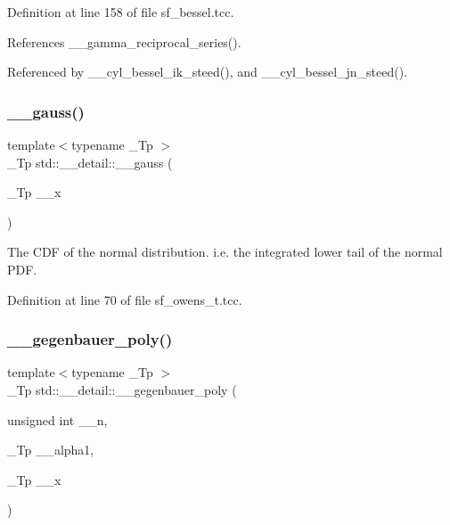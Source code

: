 Definition at line 158 of file sf\+\_\+bessel.\+tcc.



References \+\_\+\+\_\+gamma\+\_\+reciprocal\+\_\+series().



Referenced by \+\_\+\+\_\+cyl\+\_\+bessel\+\_\+ik\+\_\+steed(), and \+\_\+\+\_\+cyl\+\_\+bessel\+\_\+jn\+\_\+steed().

\mbox{\label{namespacestd_1_1____detail_afdb25beb2328b74d64d9be03de64c442}} 
\subsubsection{\texorpdfstring{\+\_\+\+\_\+gauss()}{\_\_gauss()}}
{\footnotesize\ttfamily template$<$typename \+\_\+\+Tp $>$ \\
\+\_\+\+Tp std\+::\+\_\+\+\_\+detail\+::\+\_\+\+\_\+gauss (\begin{DoxyParamCaption}\item[{\+\_\+\+Tp}]{\+\_\+\+\_\+x }\end{DoxyParamCaption})}

The C\+DF of the normal distribution. i.\+e. the integrated lower tail of the normal P\+DF. 

Definition at line 70 of file sf\+\_\+owens\+\_\+t.\+tcc.

\mbox{\label{namespacestd_1_1____detail_af8641aafc4c639c68963e53d1f6c7083}} 
\subsubsection{\texorpdfstring{\+\_\+\+\_\+gegenbauer\+\_\+poly()}{\_\_gegenbauer\_poly()}}
{\footnotesize\ttfamily template$<$typename \+\_\+\+Tp $>$ \\
\+\_\+\+Tp std\+::\+\_\+\+\_\+detail\+::\+\_\+\+\_\+gegenbauer\+\_\+poly (\begin{DoxyParamCaption}\item[{unsigned int}]{\+\_\+\+\_\+n,  }\item[{\+\_\+\+Tp}]{\+\_\+\+\_\+alpha1,  }\item[{\+\_\+\+Tp}]{\+\_\+\+\_\+x }\end{DoxyParamCaption})}

